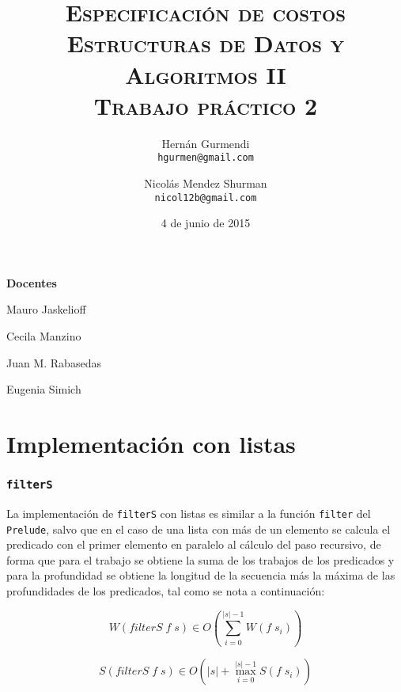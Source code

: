\documentclass[a4paper,10pt]{article}
\author{
    Hernán Gurmendi \\
    \texttt{hgurmen@gmail.com}
    \and Nicolás Mendez Shurman \\
    \texttt{nicol12b@gmail.com}
}
\date{
    4 de junio de 2015
}
\title{
    \Huge \textsc{Especificación de costos} \\
    \large \textsc{Estructuras de Datos y Algoritmos II} \\
    \textsc{Trabajo práctico 2}
}
\begin{document}
\maketitle

\thispagestyle{empty}

\begin{center}
\large \bf Docentes
\end{center}

\begin{center}
Mauro Jaskelioff

Cecila Manzino

Juan M. Rabasedas

Eugenia Simich
\end{center}

\newpage{}


\part*{Implementación con listas}


\section*{\texttt{filterS}}

La implementación de \texttt{filterS} con listas es similar a la función \texttt{filter}
del \texttt{Prelude}, salvo que en el caso de una lista con más de un elemento se
calcula el predicado con el primer elemento en paralelo al cálculo del paso
recursivo, de forma que para el trabajo se obtiene la suma de los trabajos de los
predicados y para la profundidad se obtiene la longitud de la secuencia más la
máxima de las profundidades de los predicados, tal como se nota a continuación:


\begin{equation*}
    W \left( filterS\; f \; s \right) \in
    O \left( \sum_{i=0}^{\vert s \vert -1} W \left( f \; s_i \right) \right)
\end{equation*}

\begin{equation*}
    S \left( filterS\; f \; s \right) \in
    O \left( \vert s \vert + \max_{i=0}^{\vert s \vert -1} S \left( f \; s_i \right) \right)
\end{equation*}
\end{document}
